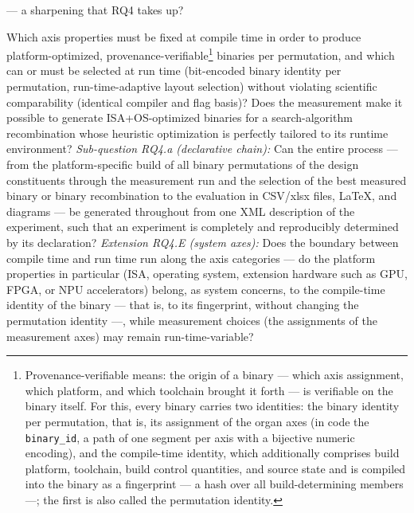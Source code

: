\begin{description}
  --- a sharpening that RQ4 takes up?
  \item[RQ4 (Compile time vs.\ run time)] Which axis properties must be fixed at compile time
  in order to produce platform-optimized, provenance-verifiable\footnote{Provenance-verifiable
  means: the origin of a binary --- which axis assignment, which platform, and which
  toolchain brought it forth --- is verifiable on the binary itself. For this, every
  binary carries two identities: the binary identity per permutation, that is, its assignment of the organ axes
  (in code the \texttt{binary\_id}, a path of one segment per axis with a bijective
  numeric encoding), and the compile-time identity, which additionally comprises build platform, toolchain,
  build control quantities, and source state and is compiled into the binary as a fingerprint --- a hash over all
  build-determining members ---; the first is also called the
  permutation identity.} binaries per permutation, and which can or must be selected at run time
  (bit-encoded binary identity per permutation, run-time-adaptive layout selection) without violating
  scientific comparability (identical compiler and flag basis)? Does the measurement make it possible to
  generate ISA+OS-optimized binaries for a search-algorithm recombination whose heuristic
  optimization is perfectly tailored to its runtime environment?
  \emph{Sub-question RQ4.a (declarative chain):} Can the entire process --- from the platform-specific
  build of all binary permutations of the design constituents through the measurement run and the selection of the best
  measured binary or binary recombination to the evaluation in CSV/xlsx files, LaTeX, and
  diagrams --- be generated throughout from one XML description of the experiment, such that an
  experiment is completely and reproducibly determined by its declaration?
  \emph{Extension RQ4.E (system axes):} Does the boundary between compile time and run time run
  along the axis categories --- do the platform properties in particular (ISA,
  operating system, extension hardware such as GPU, FPGA, or NPU accelerators) belong, as system concerns, to
  the compile-time identity of the
  binary --- that is, to its fingerprint, without changing the permutation identity ---, while
  measurement choices (the assignments of the measurement axes) may remain run-time-variable?
\end{description}

